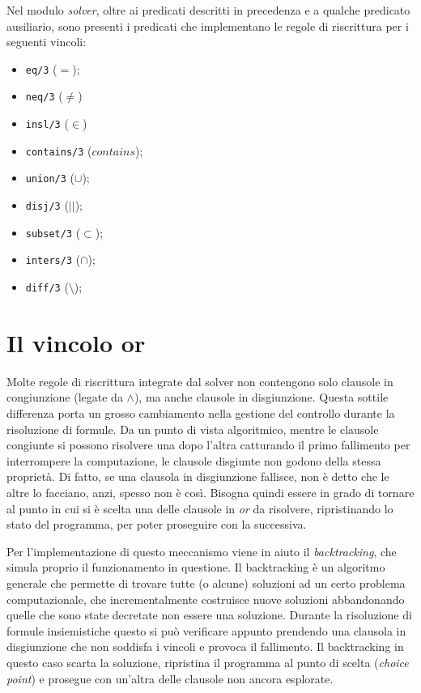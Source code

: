 \documentclass[12pt,a4paper,openright]{book} %
\begin{document}
Nel modulo \emph{solver}, oltre ai predicati descritti in precedenza e
a qualche predicato ausiliario, sono presenti i predicati che
implementano le regole di riscrittura per i seguenti vincoli:
\begin{itemize}
\item \verb|eq/3| ($=$);
\item \verb|neq/3| ($\neq$)
\item \verb|insl/3| ($\in$)
\item \verb|contains/3| ($contains$);
\item \verb|union/3| ($\cup$);
\item \verb|disj/3| ($||$);
\item \verb|subset/3| ($\subset$);
\item \verb|inters/3| ($\cap$);
\item \verb|diff/3| ($\setminus$);
\end{itemize}

\section{Il vincolo or}
\label{sec:lsetpicat_or}

Molte regole di riscrittura integrate dal solver non contengono solo
clausole in congiunzione (legate da $\land$), ma anche clausole in
disgiunzione. Questa sottile differenza porta un grosso cambiamento
nella gestione del controllo durante la risoluzione di formule. Da un
punto di vista algoritmico, mentre le clausole congiunte si possono
risolvere una dopo l'altra catturando il primo fallimento per
interrompere la computazione, le clausole disgiunte non godono della
stessa proprietà. Di fatto, se una clausola in disgiunzione fallisce,
non è detto che le altre lo facciano, anzi, spesso non è così. Bisogna
quindi essere in grado di tornare al punto in cui si è scelta una
delle clausole in \emph{or} da risolvere, ripristinando lo stato del
programma, per poter proseguire con la successiva.

Per l'implementazione di questo meccanismo viene in aiuto il
\emph{backtracking}, che simula proprio il funzionamento in
questione. Il backtracking è un algoritmo generale che permette di
trovare tutte (o alcune) soluzioni ad un certo problema
computazionale, che incrementalmente costruisce nuove soluzioni
abbandonando quelle che sono state decretate non essere una
soluzione. Durante la risoluzione di formule insiemistiche questo si
può verificare appunto prendendo una clausola in disgiunzione che non
soddisfa i vincoli e provoca il fallimento. Il backtracking in questo
caso scarta la soluzione, ripristina il programma al punto di scelta
(\emph{choice point}) e prosegue con un'altra delle clausole
non ancora esplorate.
\end{document}

